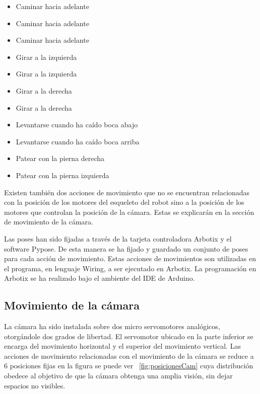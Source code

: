 \begin{itemize}
 \item {Caminar hacia adelante}
 \item {Caminar hacia adelante}
 \item {Caminar hacia adelante}
 \item {Girar a la izquierda}
 \item {Girar a la izquierda} 
 \item {Girar a la derecha}
 \item {Girar a la derecha}	 
 \item {Levantarse cuando ha caído boca abajo}
 \item {Levantarse cuando ha caído boca arriba}
 \item {Patear con la pierna derecha }
 \item {Patear con la pierna izquierda}
 
\end{itemize}

Existen también dos acciones de movimiento que no se encuentran relacionadas con la posición de los motores del esqueleto del robot sino a la posición de los motores que controlan la posición de la cámara. Estas se explicarán en la sección de movimiento de la cámara.

Las poses han sido fijadas a través de la tarjeta controladora Arbotix y el software Pypose. De esta manera se ha fijado y guardado un conjunto de poses para cada acción de movimiento. Estas acciones de movimientos son utilizadas en el programa, en lenguaje Wiring, a ser ejecutado en Arbotix. La programación en Arbotix se ha realizado bajo el ambiente del IDE de Arduino. 


\subsection{Movimiento de la cámara}
La cámara ha sido instalada sobre dos micro servomotores analógicos, otorgándole dos grados de libertad. El servomotor ubicado en la parte inferior se encarga del movimiento horizontal y el superior del movimiento vertical. Las acciones de movimiento relacionadas con el movimiento de la cámara se reduce a 6 posiciones fijas en la figura se puede ver ~\ref{fig:posicionesCam} cuya distribución obedece al objetivo de que la cámara obtenga una amplia visión, sin dejar espacios no visibles. 



